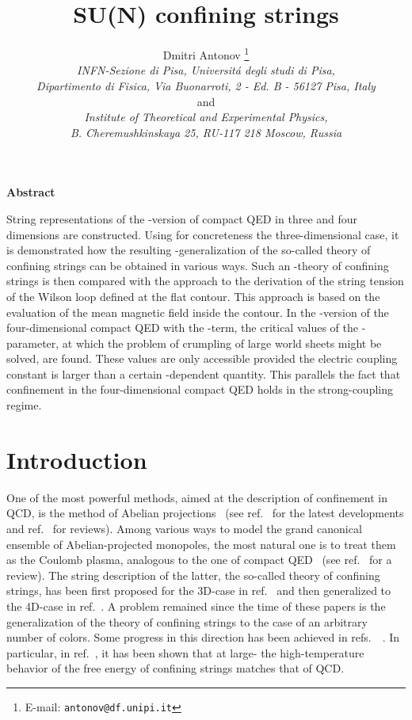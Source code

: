 \documentclass[a4paper,12pt]{article}
\title{
\vspace{-3mm}
\rightline{\small IFUP-TH 2003/17}
\vspace{8mm}
\bf SU(N) confining strings}
\author{Dmitri Antonov
\thanks{E-mail: {\tt antonov@df.unipi.it}}
\\
{\it INFN-Sezione di Pisa, Universit\'a degli studi di Pisa,}\\
{\it Dipartimento di Fisica, Via Buonarroti, 2 - Ed. B - 56127 Pisa, Italy}\\
and\\
{\it Institute of Theoretical and Experimental Physics,}\\
{\it B. Cheremushkinskaya 25, RU-117 218 Moscow, Russia}}
\date{}
\begin{document}
\maketitle
\vspace{1mm}
\centerline{\bf {Abstract}}
\vspace{3mm}
\noindent
String representations of the \coordHE{}-version of compact QED in three and four dimensions are constructed.
Using for concreteness
the three-dimensional case, it is demonstrated how the resulting \coordHE{}-generalization
of the so-called theory of confining strings can be
obtained in various ways. Such an \coordHE{}-theory of confining strings is then compared
with the approach to the derivation of the string tension of the Wilson loop defined at the flat contour. This approach is
based on the evaluation of the mean magnetic field inside the contour.
In the \coordHE{}-version of the four-dimensional compact QED with the \myHighlight{$\theta$}\coordHE{}-term,
the critical values of the \myHighlight{$\theta$}\coordHE{}-parameter, at which the problem of crumpling of large world sheets might be solved, are found.
These values are only accessible provided the electric coupling constant is larger than a certain \coordHE{}-dependent quantity. This
parallels the fact that confinement in the four-dimensional compact QED holds in the strong-coupling regime.


\newpage

\section{Introduction}
One of the most powerful methods, aimed at the description of confinement in QCD, is the method
of Abelian projections~\cite{th} (see ref.~\cite{suN} for the latest developments and ref.~\cite{digiacomo} for reviews). Among various ways to
model the grand canonical ensemble of Abelian-projected monopoles, the most natural one is
to treat them as the Coulomb plasma, analogous to the one of compact QED~\cite{polpl} (see ref.~\cite{dg} for a review). The string description
of the latter, the so-called theory of confining strings, has been first proposed
for the 3D-case in ref.~\cite{pol} and then generalized to the 4D-case in ref.~\cite{cristina}.
A problem remained since the time of these papers is the generalization of the theory of confining strings
to the case of an arbitrary number of
colors. Some progress in this direction has been achieved in refs.~~\cite{suN1, suN2}. In particular, in ref.~\cite{suN1}, it has been
shown that at large-\coordHE{}
the high-temperature behavior of the free energy of confining strings matches that of QCD.
\end{document}
